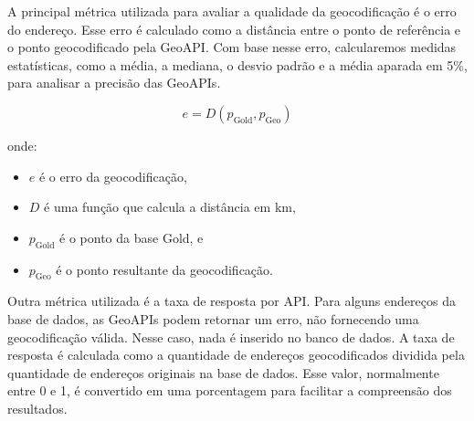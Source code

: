 A principal métrica utilizada para avaliar a qualidade da geocodificação é o erro do endereço. Esse erro é calculado como a distância entre o ponto de referência e o ponto geocodificado pela GeoAPI. Com base nesse erro, calcularemos medidas estatísticas, como a média, a mediana, o desvio padrão e a média aparada em 5\%, para analisar a precisão das GeoAPIs.

\begin{equation}
    e = D(p_{\text{Gold}}, p_{\text{Geo}})
    \end{equation}
    
    onde:
    \begin{itemize}
      \item $e$ é o erro da geocodificação,
      \item $D$ é uma função que calcula a distância em km,
      \item $p_{\text{Gold}}$ é o ponto da base Gold, e
      \item $p_{\text{Geo}}$ é o ponto resultante da geocodificação.
    \end{itemize}

    
Outra métrica utilizada é a taxa de resposta por API. Para alguns endereços da base de dados, as GeoAPIs podem retornar um erro, não fornecendo uma geocodificação válida. Nesse caso, nada é inserido no banco de dados. A taxa de resposta é calculada como a quantidade de endereços geocodificados dividida pela quantidade de endereços originais na base de dados. Esse valor, normalmente entre 0 e 1, é convertido em uma porcentagem para facilitar a compreensão dos resultados.
